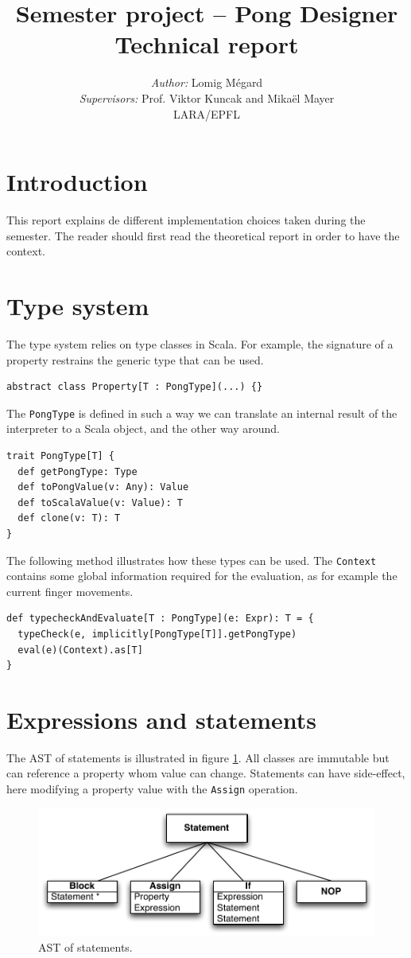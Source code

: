 \documentclass[11pt,a4paper]{article}
\title{Semester project -- Pong Designer\\Technical report}
\author{\textit{Author:} Lomig Mégard\\
\textit{Supervisors:} Prof. Viktor Kuncak and Mikaël Mayer\vspace*{0.5cm}\\
\textsc{LARA/EPFL}}
\begin{document}
\maketitle

\section{Introduction}
This report explains de different implementation choices taken during the semester. The reader should first read the theoretical report in order to have the context.


\section{Type system}
The type system relies on type classes in Scala. For example, the signature of a property restrains the generic type that can be used.
\begin{lstlisting}
abstract class Property[T : PongType](...) {}
\end{lstlisting}

The \texttt{PongType} is defined in such a way we can translate an internal result of the interpreter to a Scala object, and the other way around.
\begin{lstlisting}
trait PongType[T] {
  def getPongType: Type
  def toPongValue(v: Any): Value
  def toScalaValue(v: Value): T
  def clone(v: T): T
}
\end{lstlisting}

The following method illustrates how these types can be used. The \texttt{Context} contains some global information required for the evaluation, as for example the current finger movements.
\begin{lstlisting}
def typecheckAndEvaluate[T : PongType](e: Expr): T = {
  typeCheck(e, implicitly[PongType[T]].getPongType)
  eval(e)(Context).as[T]
}
\end{lstlisting}

\clearpage
\section{Expressions and statements}
The AST of statements is illustrated in figure \ref{fig:AST-stats}. All classes are immutable but can reference a property whom value can change. Statements can have side-effect, here modifying a property value with the \texttt{Assign} operation. 

\begin{figure}[h]
\centering
\includegraphics[scale = 0.7]{images/AST_stats} 
\caption{AST of statements.}
\label{fig:AST-stats}
\end{figure}
\end{document}
